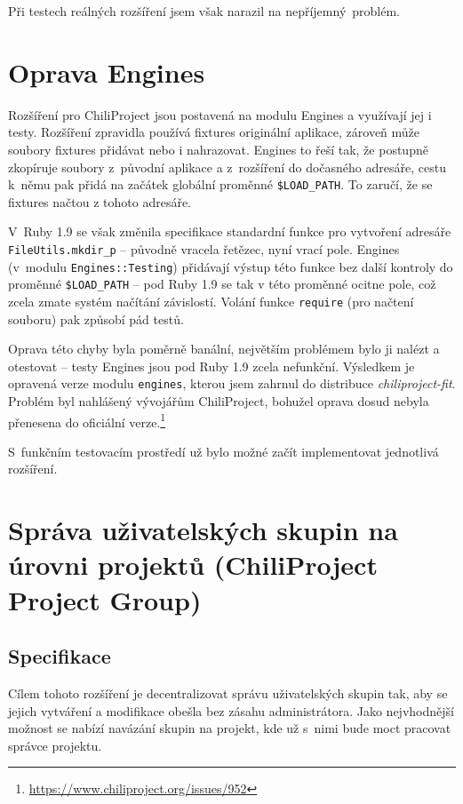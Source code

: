 \documentclass[thesis=B,czech]{FITthesis}[2012/05/02]
\begin{document}
Při testech reálných rozšíření jsem však narazil na nepříjemný~problém.

\section{Oprava Engines}
\label{sec:oprava-engines}

Rozšíření pro ChiliProject jsou postavená na modulu Engines a
využívají jej i testy. Rozšíření zpravidla používá
\gls{fixtures} originální aplikace, zároveň může soubory fixtures
přidávat nebo i nahrazovat. Engines to řeší tak, že postupně zkopíruje
soubory z~původní aplikace a z~rozšíření do dočasného adresáře, cestu
k~němu pak přidá na začátek globální proměnné
\lstinline!$LOAD_PATH!. To zaručí, že se fixtures načtou z tohoto
adresáře.

V~Ruby 1.9 se však změnila specifikace standardní funkce pro vytvoření
adresáře \lstinline!FileUtils.mkdir_p! -- původně vracela řetězec, nyní
vrací pole. Engines (v~modulu \lstinline!Engines::Testing!) přidávají
výstup této funkce bez další kontroly do proměnné \lstinline!$LOAD_PATH!
-- pod Ruby 1.9 se tak v této proměnné ocitne pole, což zcela zmate
systém načítání závislostí. Volání funkce \lstinline!require! (pro
načtení souboru) pak způsobí pád testů.

Oprava této chyby byla poměrně banální, největším problémem bylo ji
nalézt a otestovat -- testy Engines jsou pod Ruby 1.9 zcela nefunkční.
Výsledkem je opravená verze modulu \lstinline!engines!, kterou jsem
zahrnul do distribuce \emph{chiliproject-fit}. Problém byl
nahlášený vývojářům ChiliProject, bohužel oprava dosud nebyla přenesena
do oficiální verze.\footnote{\url{https://www.chiliproject.org/issues/952}}

S~funkčním testovacím prostředí už bylo možné začít implementovat
jednotlivá rozšíření.

\section[Správa uživatelských skupin na úrovni projektů]{Správa uživatelských skupin na úrovni projektů (ChiliProject
Project Group)}
\label{sec:project_group}

\subsection{Specifikace}

Cílem tohoto rozšíření je decentralizovat správu uživatelských skupin
tak, aby se jejich vytváření a modifikace obešla bez zásahu
administrátora. Jako nejvhodnější možnost se nabízí navázání skupin na
projekt, kde už s~nimi bude moct pracovat správce projektu.
\end{document}
